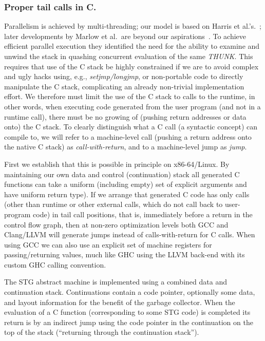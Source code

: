 \documentclass{llncs}
\begin{document}
\subsubsection{Proper tail calls in C.}
Parallelism is achieved by multi-threading; our model is based on Harris et
al.'s.~\cite{Harris:2005}; later developments by Marlow et al.\ are beyond our
aspirations~\cite{Marlow:2009,Marlow:2011}.  To achieve efficient parallel
execution they identified the need for the ability to examine and unwind the
stack in quashing concurrent evaluation of the same \emph{THUNK}\@.  This
requires that use of the C stack be highly constrained if we are to avoid
complex and ugly hacks using, e.g., \emph{setjmp/longjmp}, or non-portable
code to directly manipulate the C stack, complicating an already non-trivial
implementation effort.  We therefore must limit the use of the C stack to
calls to the runtime, in other words, when executing code generated from the
user program (and not in a runtime call), there must be no growing of (pushing
return addresses or data onto) the C stack.
%
To clearly distinguish what a C call (a syntactic concept) can compile to, we
will refer to a machine-level call (pushing a return address onto the native C stack)
as \emph{call-with-return}, and to a machine-level jump as \emph{jump}.

First we establish that this is possible in principle on x86-64/Linux.  By
maintaining our own data and control (continuation) stack all generated C
functions can take a uniform (including empty) set of explicit arguments and
have uniform return type). If we arrange that generated C code has only calls
(other than runtime or other external calls, which do not call back to
user-program code) in tail call positions, that is, immediately before a
return in the control flow graph, then at non-zero optimization levels both
GCC and Clang/LLVM will generate jumps instead of calls-with-return for C
calls.  When using GCC we can also use an explicit set of machine registers
for passing/returning values, much like GHC using the LLVM back-end with its
custom GHC calling convention.

The STG abstract machine is implemented using a combined data and continuation stack.
Continuations contain a code pointer, optionally some data, and layout
information for the benefit of the garbage collector.  
When the evaluation of a C function (corresponding to some STG code) is
completed its return is by an indirect jump using the code pointer in the
continuation on the top of the stack (``returning through the continuation
stack'').
\end{document}

